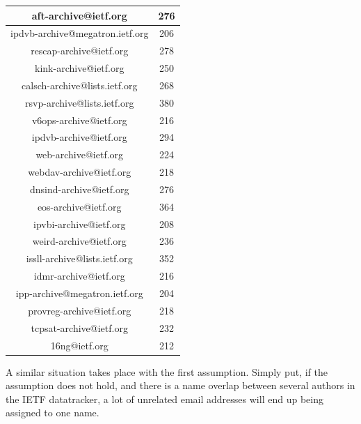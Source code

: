 \documentclass[a4paper,english]{report}
\begin{document}
\begin{center}
\begin{tabular}{||c | c||}
aft-archive@ietf.org & 276\\
\hline

ipdvb-archive@megatron.ietf.org & 206\\
\hline

rescap-archive@ietf.org & 278\\
\hline

kink-archive@ietf.org & 250\\
\hline

calsch-archive@lists.ietf.org & 268\\
\hline

rsvp-archive@lists.ietf.org & 380\\
\hline

v6ops-archive@ietf.org & 216\\
\hline

ipdvb-archive@ietf.org & 294\\
\hline

web-archive@ietf.org & 224\\
\hline

webdav-archive@ietf.org & 218\\
\hline

dnsind-archive@ietf.org & 276\\
\hline

eos-archive@ietf.org & 364\\
\hline

ipvbi-archive@ietf.org & 208\\
\hline

weird-archive@ietf.org & 236\\
\hline

issll-archive@lists.ietf.org & 352\\
\hline

idmr-archive@ietf.org & 216\\
\hline

ipp-archive@megatron.ietf.org & 204\\
\hline

provreg-archive@ietf.org & 218\\
\hline

tcpsat-archive@ietf.org & 232\\
\hline

16ng@ietf.org & 212\\
\hline


\end{tabular}
\end{center}

A similar situation takes place with the first assumption. Simply put, if the assumption does not hold, and there is a name  overlap between several authors in the IETF datatracker, a lot of unrelated email addresses will end up being assigned to one name.
\end{document}
